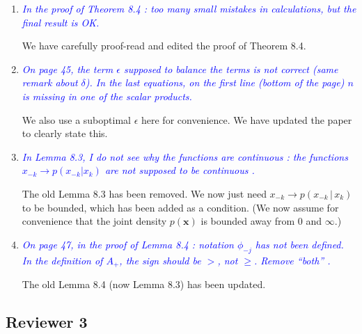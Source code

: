\documentclass[pdftex,12pt]{article}
\def\rc#1{{\it\textcolor{blue}{#1}}\smallskip}
\begin{document}
\begin{enumerate}
\item \rc{In the proof of Theorem 8.4 : too many small mistakes in
calculations, but the final result is OK.}

We have carefully proof-read and edited the proof of Theorem 8.4. 

\item \rc{On page 45, the term $\epsilon$ supposed to balance the terms is not correct
(same remark about $\delta$). In the last equations, on the first line (bottom
of the page) $n$ is missing in one of the scalar products.}

We also use a suboptimal $\epsilon$ here for convenience. We have updated the paper to clearly state this.

\item \rc{In Lemma 8.3, I do not see why the functions are continuous : the
functions $x_{-k} \rightarrow p(x_{-k} | x_k)$ are not supposed to be continuous .}

The old Lemma 8.3 has been removed. We now just need $x_{-k}
\rightarrow p(x_{-k} \,|\, x_k)$ to be bounded, which has been added
as a condition. (We now assume for convenience that the joint density
$p(\mathbf{x})$ is bounded away from 0 and $\infty$.)

\item \rc{On page 47, in the proof of Lemma 8.4 : notation $\phi_{-j}$
  has not been defined.
In the definition of $A_+$, the sign should be $>$, not $\geq$. Remove ``both'' .}

The old Lemma 8.4 (now Lemma 8.3) has been updated. 


\end{enumerate}

\subsection*{Reviewer 3}
\end{document}

